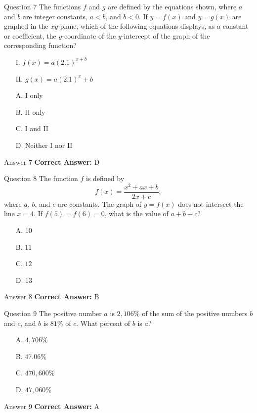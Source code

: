 \documentclass{beamer}
\begin{document}
\begin{frame}{Question 7}
\small
The functions \(f\) and \(g\) are defined by the equations shown, where \(a\) and \(b\) are integer constants, \(a < b\), and \(b < 0\). If \(y = f(x)\) and \(y = g(x)\) are graphed in the \(xy\)-plane, which of the following equations displays, as a constant or coefficient, the \(y\)-coordinate of the \(y\)-intercept of the graph of the corresponding function?
\begin{itemize}
\item[I.] \(f(x) = a(2.1)^{x + b}\)
\item[II.] \(g(x) = a(2.1)^{x} + b\)
\end{itemize}
\vspace{0.35cm}
\begin{enumerate}
    \item[A.] I only
    \item[B.] II only
    \item[C.] I and II
    \item[D.] Neither I nor II
\end{enumerate}
\end{frame}
\begin{frame}{Answer 7}
\small
\textbf{Correct Answer:} D
\end{frame}

\begin{frame}{Question 8}
\small
The function \(f\) is defined by
\[
f(x) = \dfrac{x^{2} + ax + b}{2x + c},
\]
where \(a\), \(b\), and \(c\) are constants. The graph of \(y = f(x)\) does not intersect the line \(x = 4\). If \(f(5) = f(6) = 0\), what is the value of \(a + b + c\)?
\vspace{0.35cm}
\begin{enumerate}
    \item[A.] \(10\)
    \item[B.] \(11\)
    \item[C.] \(12\)
    \item[D.] \(13\)
\end{enumerate}
\end{frame}
\begin{frame}{Answer 8}
\small
\textbf{Correct Answer:} B
\end{frame}

\begin{frame}{Question 9}
\small
The positive number \(a\) is \(2{,}106\%\) of the sum of the positive numbers \(b\) and \(c\), and \(b\) is \(81\%\) of \(c\).
What percent of \(b\) is \(a\)?
\vspace{0.35cm}
\begin{enumerate}
    \item[A.] \(4{,}706\%\)
    \item[B.] \(47.06\%\)
    \item[C.] \(470{,}600\%\)
    \item[D.] \(47{,}060\%\)
\end{enumerate}
\end{frame}
\begin{frame}{Answer 9}
\small
\textbf{Correct Answer:} A
\end{frame}
\end{document}
